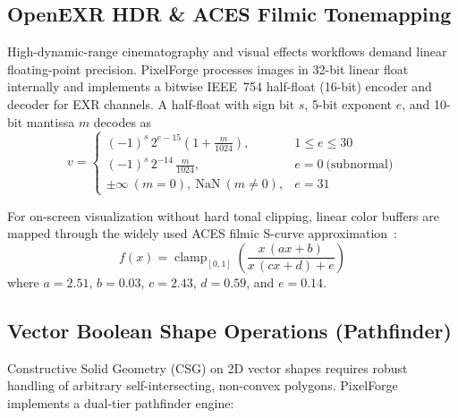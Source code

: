 \documentclass[10pt,journal,compsoc]{IEEEtran}
\begin{document}
\subsection{OpenEXR HDR \& ACES Filmic Tonemapping}
High-dynamic-range cinematography and visual effects workflows demand linear floating-point precision. PixelForge processes images in 32-bit linear float internally and implements a bitwise IEEE~754 half-float (16-bit) encoder and decoder for EXR channels. A half-float with sign bit $s$, 5-bit exponent $e$, and 10-bit mantissa $m$ decodes as
\begin{equation}
v = \begin{cases}
(-1)^s \, 2^{e-15} \left(1 + \frac{m}{1024}\right), & 1 \le e \le 30 \\[3pt]
(-1)^s \, 2^{-14} \, \frac{m}{1024}, & e = 0 \ \text{(subnormal)} \\[3pt]
\pm\infty \ (m = 0), \ \text{NaN} \ (m \neq 0), & e = 31
\end{cases}
\end{equation}

For on-screen visualization without hard tonal clipping, linear color buffers are mapped through the widely used ACES filmic S-curve approximation~\cite{narkowicz2016}:
\begin{equation}
f(x) = \operatorname{clamp}_{[0,1]}\!\left(\frac{x\,(a x + b)}{x\,(c x + d) + e}\right)
\end{equation}
where $a = 2.51$, $b = 0.03$, $c = 2.43$, $d = 0.59$, and $e = 0.14$.

\subsection{Vector Boolean Shape Operations (Pathfinder)}
Constructive Solid Geometry (CSG) on 2D vector shapes requires robust handling of arbitrary self-intersecting, non-convex polygons. PixelForge implements a dual-tier pathfinder engine:
\end{document}
